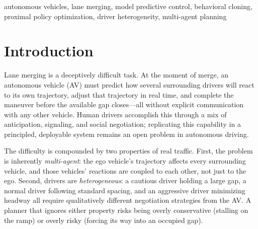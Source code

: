 \documentclass[conference]{IEEEtran}
\begin{document}
\begin{IEEEkeywords}
autonomous vehicles, lane merging, model predictive control, behavioral cloning,
proximal policy optimization, driver heterogeneity, multi-agent planning
\end{IEEEkeywords}

\section{Introduction}

Lane merging is a deceptively difficult task. At the moment of merge, an
autonomous vehicle (AV) must predict how several surrounding drivers will react
to its own trajectory, adjust that trajectory in real time, and complete the
maneuver before the available gap closes---all without explicit communication
with any other vehicle. Human drivers accomplish this through a mix of
anticipation, signaling, and social negotiation; replicating this capability in
a principled, deployable system remains an open problem in autonomous driving.

The difficulty is compounded by two properties of real traffic. First, the
problem is inherently \emph{multi-agent}: the ego vehicle's trajectory affects
every surrounding vehicle, and those vehicles' reactions are coupled to each
other, not just to the ego. Second, drivers are \emph{heterogeneous}: a cautious
driver holding a large gap, a normal driver following standard spacing, and an
aggressive driver minimizing headway all require qualitatively different
negotiation strategies from the AV. A planner that ignores either property risks
being overly conservative (stalling on the ramp) or overly risky (forcing its
way into an occupied gap).
\end{document}
